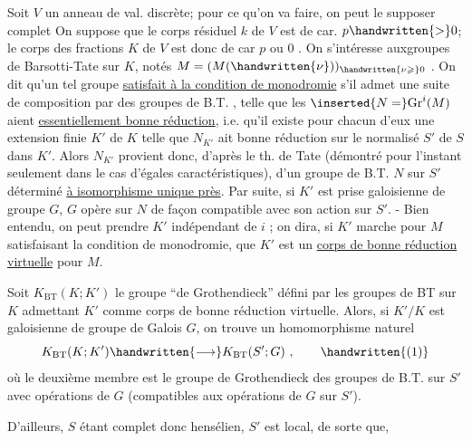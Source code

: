 
Soit $V$ un anneau de val. discrète; pour ce qu'on va faire, on peut le supposer complet  On suppose que le corps résiduel $k$ de $V$ est de car. $p\handwritten{>}0$; le corps des fractions $K$ de $V$ est donc de car $p$ ou $0$ . On  s'intéresse auxgroupes de Barsotti-Tate sur $K$, notés $M=(M(\handwritten{\nu}))_{\handwritten{\nu\geqslant}0}$ . On dit qu'un tel groupe \uline{satisfait à la condition de monodromie} s'il admet une suite de composition par des groupes de B.T. , telle que les $\inserted{N=}\mathrm{Gr}^{i}(M)$ aient \uline{essentiellement bonne réduction}, i.e. qu'il existe pour chacun d'eux une extension finie  $K'$ de $K$ telle que  $N_{K'}$ ait bonne réduction sur le normalisé $S'$ de $S$ dans $K'$. Alors $N_{K'}$ provient  donc, d'après le th. de Tate (démontré pour l'instant seulement dans le cas d'égales caractéristiques), d'un  groupe de B.T. $N$ sur $S'$ déterminé \uline{à isomorphisme unique près}. Par suite, si $K'$ est prise galoisienne de groupe $G$, $G$ opère sur  $N$ de façon compatible avec son action sur $S'$. - Bien entendu, on peut prendre $K'$ indépendant de $i$ ; on dira, si $K'$ marche pour $M$ satisfaisant la condition de monodromie, que $K'$ est un \uline{corps de bonne réduction virtuelle} pour $M$.

Soit $K_{\mathrm{BT}}(K;K')$ le groupe ``de Grothendieck''  défini par les groupes de BT sur $K$ admettant $K'$ comme corps de bonne réduction virtuelle. Alors, si $K'/K$ est galoisienne de groupe de Galois $G$, on trouve un homomorphisme naturel
\[
K_{\mathrm{BT}}(K;K')\handwritten{\longrightarrow}K_{\mathrm{BT}}(S';G)\ ,\tag*{\handwritten{(1)}}
\]
où le deuxième membre est le groupe de Grothendieck des groupes de B.T. sur $S'$ avec opérations de $G$ (compatibles aux opérations de $G$ sur $S'$).

D'ailleurs, $S$ étant complet donc hensélien, $S'$ est local, de sorte que,

